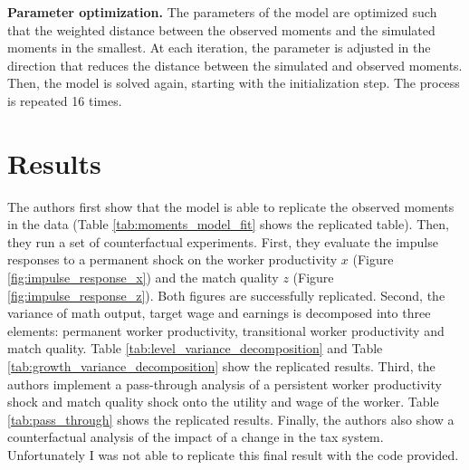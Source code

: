 \documentclass{article}
\begin{document}
\textbf{Parameter optimization.} The parameters of the model are optimized such that the weighted distance between the observed moments and the simulated moments in the smallest. At each iteration, the parameter is adjusted in the direction that reduces the distance between the simulated and observed moments. Then, the model is solved again, starting with the initialization step. The process is repeated 16 times. 
 

\section{Results}

The authors first show that the model is able to replicate the observed moments in the data (Table \ref{tab:moments_model_fit} shows the replicated table). Then, they run a set of counterfactual experiments. First, they evaluate the impulse responses to a permanent shock on the worker productivity $x$ (Figure \ref{fig:impulse_response_x}) and the match quality $z$ (Figure \ref{fig:impulse_response_z}). Both figures are successfully replicated. Second, the variance of math output, target wage and earnings is decomposed into three elements: permanent worker productivity, transitional worker productivity and match quality. Table \ref{tab:level_variance_decomposition} and Table \ref{tab:growth_variance_decomposition} show the replicated results. Third, the authors implement a pass-through analysis of a persistent worker productivity shock and match quality shock onto the utility and wage of the worker. Table \ref{tab:pass_through} shows the replicated results. Finally, the authors also show a counterfactual analysis of the impact of a change in the tax system. Unfortunately I was not able to replicate this final result with the code provided.
\end{document}
